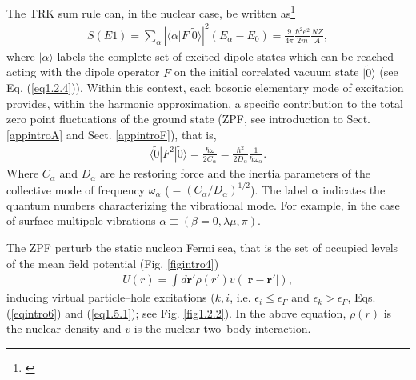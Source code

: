 The TRK sum rule can, in the nuclear case, be written as\footnote{\cite{Bohr:75,Bertsch:05,Bortignon:98}}
\begin{align}\label{eq_intro1}
S(E1)=\sum_\alpha\left|\langle\alpha|F|\tilde 0\rangle\right|^2(E_\alpha-E_0)=\frac{9}{4\pi}\frac{\hbar^2e^2}{2m}\frac{NZ}{A},
\end{align}
where $|\alpha\rangle$ labels the complete set of excited dipole states which can be reached acting with the dipole operator $F$ on the initial correlated vacuum state $|\tilde 0\rangle$ (see Eq. (\ref{eq1.2.4})). Within this context, each bosonic elementary mode of excitation provides, within the harmonic approximation, a specific contribution to the total zero point fluctuations of the ground state (ZPF, see introduction to Sect. \ref{appintroA} and Sect. \ref{appintroF}), that is,
\begin{align}\label{eqintro2}
\langle\tilde 0|F^2|\tilde 0\rangle=\frac{\hbar \omega}{2C_\alpha}=\frac{\hbar^2}{2D_\alpha}\frac{1}{\hbar\omega_\alpha}.
\end{align}
Where $C_\alpha$ and $D_\alpha$ are he restoring force and the inertia parameters of the collective mode of frequency $\omega_\alpha$ ($=(C_\alpha/D_{\alpha})^{1/2}$). The label $\alpha$ indicates the quantum numbers characterizing the vibrational mode. For example, in the case of surface multipole vibrations $\alpha\equiv(\beta=0,\lambda\mu,\pi)$.



The ZPF perturb the static nucleon Fermi sea, that is the set of occupied levels of the mean field potential (Fig. \ref{figintro4})
\begin{align}\label{eqintro3}
U(r)=\int d\mathbf r' \rho(r')v(|\mathbf r-\mathbf r'|),
\end{align}
inducing virtual particle--hole excitations ($k,i$, i.e. $\epsilon_i\leq\epsilon_F$ and $\epsilon_k>\epsilon_F$,  Eqs. (\ref{eqintro6}) and (\ref{eq1.5.1}); see Fig. \ref{fig1.2.2}). In the above equation, $\rho(r)$ is the nuclear density and $v$ is the nuclear two--body interaction.  


